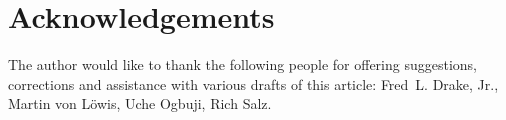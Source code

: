 \documentclass{howto}
\begin{document}
\begin{comment}

\subsection{Related Links}

The W3C's XSL page is at \url{http://www.w3.org/Style/XSL/}, and has links
to the XSLT specifications and to friendlier tutorials.

\end{comment}

\section{Acknowledgements \label{section-acks}}

The author would like to thank the following people for offering
suggestions, corrections and assistance with various drafts of this
article: Fred~L. Drake, Jr., Martin von L\"owis, 
Uche Ogbuji, Rich Salz.
\end{document}
